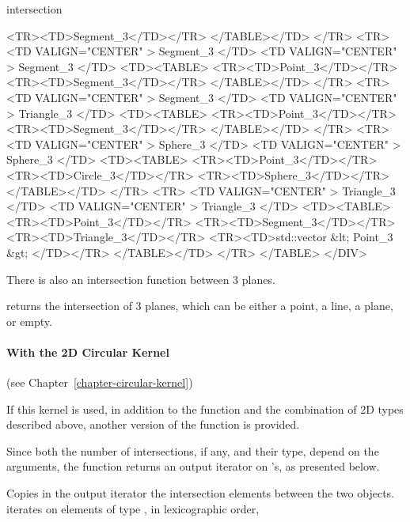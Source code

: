 \begin{ccRefFunction}{intersection}
\begin{ccHtmlOnly}
	<TR><TD>Segment_3</TD></TR>
        </TABLE></TD>
</TR>
<TR>
    <TD VALIGN="CENTER" > Segment_3 </TD>
    <TD VALIGN="CENTER" > Segment_3 </TD>
    <TD><TABLE>
	<TR><TD>Point_3</TD></TR>
	<TR><TD>Segment_3</TD></TR>
        </TABLE></TD>
</TR>
<TR>
    <TD VALIGN="CENTER" > Segment_3 </TD>
    <TD VALIGN="CENTER" > Triangle_3 </TD>
    <TD><TABLE>
	<TR><TD>Point_3</TD></TR>
	<TR><TD>Segment_3</TD></TR>
        </TABLE></TD>
</TR>
<TR>
    <TD VALIGN="CENTER" > Sphere_3 </TD>
    <TD VALIGN="CENTER" > Sphere_3 </TD>
    <TD><TABLE>
	<TR><TD>Point_3</TD></TR>
	<TR><TD>Circle_3</TD></TR>
	<TR><TD>Sphere_3</TD></TR>
        </TABLE></TD>
</TR>
<TR>
    <TD VALIGN="CENTER" > Triangle_3 </TD>
    <TD VALIGN="CENTER" > Triangle_3 </TD>
    <TD><TABLE>
	<TR><TD>Point_3</TD></TR>
	<TR><TD>Segment_3</TD></TR>
	<TR><TD>Triangle_3</TD></TR>
	<TR><TD>std::vector &lt; Point_3  &gt; </TD></TR>
        </TABLE></TD>
</TR>
</TABLE>
</DIV>
\end{ccHtmlOnly}

There is also an intersection function between 3 planes.

{returns the intersection of 3 planes, which can be either a point, a line,
a plane, or empty.}

\paragraph{With the 2D Circular Kernel} (see Chapter~\ref{chapter-circular-kernel}) 


If this kernel is used, in addition to the function and the
combination of 2D types described above, another version of the function
is provided.

Since both the number of intersections, if any, and their type,
depend on the arguments, the function returns an output
iterator on 's, as presented below. 

{Copies in the output iterator the intersection elements between the
two objects.  iterates on
elements of type , in lexicographic order,}


\end{ccRefFunction}
